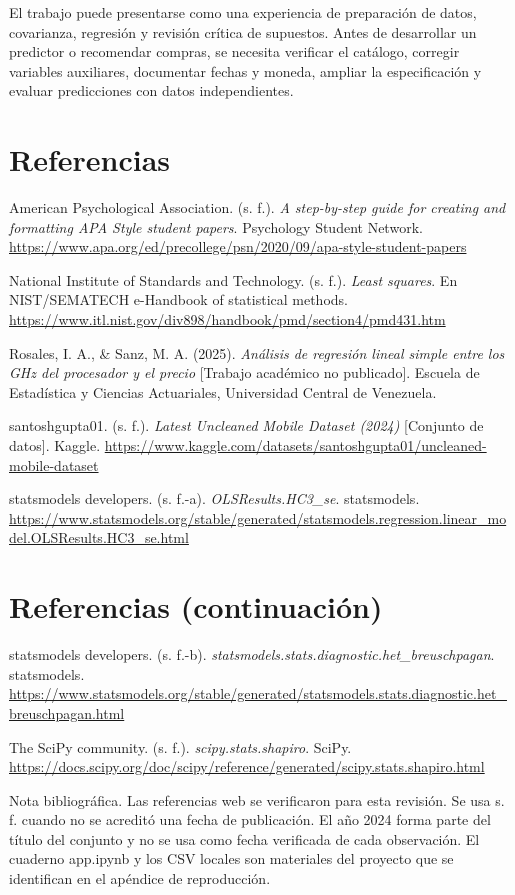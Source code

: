 \documentclass[12pt,letterpaper]{article}
\begin{document}
El trabajo puede presentarse como una experiencia de preparación de datos, covarianza, regresión y revisión crítica de supuestos. Antes de desarrollar un predictor o recomendar compras, se necesita verificar el catálogo, corregir variables auxiliares, documentar fechas y moneda, ampliar la especificación y evaluar predicciones con datos independientes.

\clearpage
\section*{Referencias}
{\setlength{\parindent}{-0.5in}\setlength{\leftskip}{0.5in}American Psychological Association. (s. f.). \textit{A step-by-step guide for creating and formatting APA Style student papers}. Psychology Student Network. \url{https://www.apa.org/ed/precollege/psn/2020/09/apa-style-student-papers}\par}
{\setlength{\parindent}{-0.5in}\setlength{\leftskip}{0.5in}National Institute of Standards and Technology. (s. f.). \textit{Least squares}. En NIST/SEMATECH e-Handbook of statistical methods. \url{https://www.itl.nist.gov/div898/handbook/pmd/section4/pmd431.htm}\par}
{\setlength{\parindent}{-0.5in}\setlength{\leftskip}{0.5in}Rosales, I. A., \& Sanz, M. A. (2025). \textit{Análisis de regresión lineal simple entre los GHz del procesador y el precio} [Trabajo académico no publicado]. Escuela de Estadística y Ciencias Actuariales, Universidad Central de Venezuela.\par}
{\setlength{\parindent}{-0.5in}\setlength{\leftskip}{0.5in}santoshgupta01. (s. f.). \textit{Latest Uncleaned Mobile Dataset (2024)} [Conjunto de datos]. Kaggle. \url{https://www.kaggle.com/datasets/santoshgupta01/uncleaned-mobile-dataset}\par}
{\setlength{\parindent}{-0.5in}\setlength{\leftskip}{0.5in}statsmodels developers. (s. f.-a). \textit{OLSResults.HC3\_se}. statsmodels. \url{https://www.statsmodels.org/stable/generated/statsmodels.regression.linear_model.OLSResults.HC3_se.html}\par}
\clearpage
\section*{Referencias (continuación)}
{\setlength{\parindent}{-0.5in}\setlength{\leftskip}{0.5in}statsmodels developers. (s. f.-b). \textit{statsmodels.stats.diagnostic.het\_breuschpagan}. statsmodels. \url{https://www.statsmodels.org/stable/generated/statsmodels.stats.diagnostic.het_breuschpagan.html}\par}
{\setlength{\parindent}{-0.5in}\setlength{\leftskip}{0.5in}The SciPy community. (s. f.). \textit{scipy.stats.shapiro}. SciPy. \url{https://docs.scipy.org/doc/scipy/reference/generated/scipy.stats.shapiro.html}\par}
Nota bibliográfica. Las referencias web se verificaron para esta revisión. Se usa s. f. cuando no se acreditó una fecha de publicación. El año 2024 forma parte del título del conjunto y no se usa como fecha verificada de cada observación. El cuaderno app.ipynb y los CSV locales son materiales del proyecto que se identifican en el apéndice de reproducción.
\end{document}
